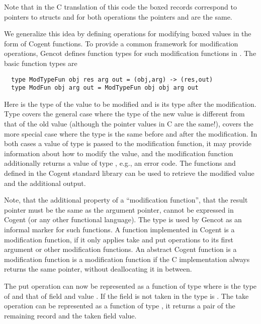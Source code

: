 Note that in the C translation of this code the boxed records correspond to pointers to structs and for both operations
the pointers  and  are the same.

We generalize this idea by defining operations for modifying boxed values in the form of Cogent functions.
To provide a common framework for modification operations, Gencot defines function types for such modification functions 
in . The basic function types are
\begin{verbatim}
  type ModTypeFun obj res arg out = (obj,arg) -> (res,out)
  type ModFun obj arg out = ModTypeFun obj obj arg out
\end{verbatim}
Here  is the type of the value to be modified and  is its type after the modification.
Type  covers the general case where the type of the new value is different from that of the old value (although the pointer
values in C are the same!),  covers the more special case where
the type is the same before and after the modification. In both cases a value of type  is passed to the modification
function, it may provide information about how to modify the value, and the modification function additionally returns a value of
type , e.g., an error code. The functions  and  defined in the Cogent standard library can be used
to retrieve the modified value and the additional output.

Note, that the additional property of a ``modification function'', that the result pointer must be the same as the argument pointer,
cannot be expressed in Cogent (or any other functional language). The type  is used by Gencot as an informal marker
for such functions. A function implemented in Cogent is a modification function, if it only applies take and put operations to its
first argument or other modification functions. An abstract Cogent function is a modification function is a modification function
if the C implementation always returns the same pointer, without deallocating it in between.

The put operation can now be represented as a function of type  where  is the type of
 and  that of field  and value . If the field is not taken in  the type is .
The take operation can be represented as a function of type , it returns 
a pair of the remaining record and the taken field value.

